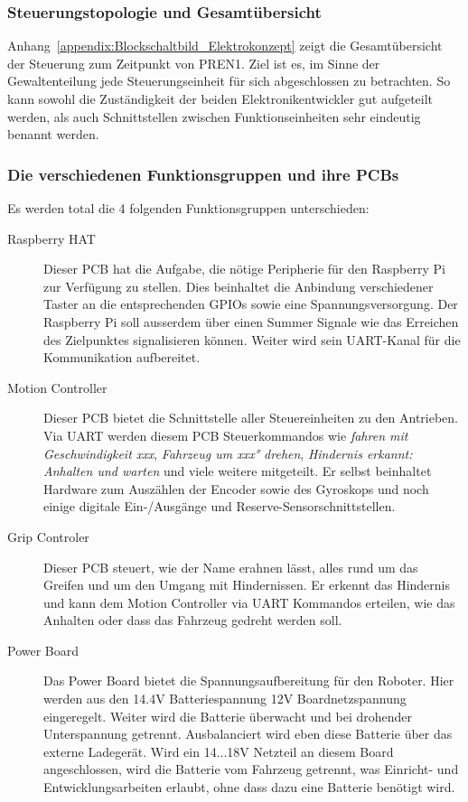 \documentclass[main.tex]{subfiles} %
\begin{document}

\subsubsection{Steuerungstopologie und Gesamtübersicht}

Anhang~\ref{appendix:Blockschaltbild_Elektrokonzept} zeigt die Gesamtübersicht
der Steuerung zum Zeitpunkt von PREN1. Ziel ist es, im Sinne der
Gewaltenteilung jede Steuerungseinheit für sich abgeschlossen zu betrachten. So
kann sowohl die Zuständigkeit der beiden Elektronikentwickler gut aufgeteilt
werden, als auch Schnittstellen zwischen Funktionseinheiten sehr eindeutig
benannt werden.

\subsubsection*{Die verschiedenen Funktionsgruppen und ihre PCBs}
Es werden total die 4 folgenden Funktionsgruppen unterschieden:

\begin{description}
      \item[Raspberry HAT] Dieser PCB hat die Aufgabe, die nötige Peripherie für den
            Raspberry Pi zur Verfügung zu stellen. Dies beinhaltet die Anbindung
            verschiedener Taster an die entsprechenden GPIOs sowie eine
            Spannungsversorgung. Der Raspberry Pi soll ausserdem über einen Summer Signale
            wie das Erreichen des Zielpunktes signalisieren können. Weiter wird sein
            UART-Kanal für die Kommunikation aufbereitet.
      \item[Motion Controller] Dieser PCB bietet die Schnittstelle aller Steuereinheiten zu
            den Antrieben. Via UART werden diesem PCB Steuerkommandos wie \textit{fahren
                  mit Geschwindigkeit xxx}, \textit{Fahrzeug um xxx° drehen}, \textit{Hindernis
                  erkannt: Anhalten und warten} und viele weitere mitgeteilt. Er selbst
            beinhaltet Hardware zum Auszählen der Encoder sowie des Gyroskops und noch
            einige digitale Ein-/Ausgänge und Reserve-Sensorschnittstellen.
      \item[Grip Controler] Dieser PCB steuert, wie der Name erahnen lässt, alles rund um
            das Greifen und um den Umgang mit Hindernissen. Er erkennt das Hindernis und
            kann dem Motion Controller via UART Kommandos erteilen, wie das Anhalten oder
            dass das Fahrzeug gedreht werden soll.
      \item[Power Board] Das Power Board bietet die Spannungsaufbereitung für den Roboter.
            Hier werden aus den 14.4V Batteriespannung 12V Boardnetzspannung eingeregelt.
            Weiter wird die Batterie überwacht und bei drohender Unterspannung getrennt.
            Ausbalanciert wird eben diese Batterie über das externe Ladegerät. Wird ein
            14...18V Netzteil an diesem Board angeschlossen, wird die Batterie vom Fahrzeug
            getrennt, was Einricht- und Entwicklungsarbeiten erlaubt, ohne dass dazu eine
            Batterie benötigt wird.
\end{description}
\end{document}
